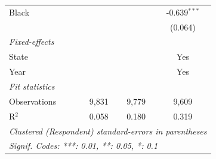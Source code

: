 \begin{tabular}{lccc}
   Black                          &                &                & -0.639$^{***}$\\   
                                  &                &                & (0.064)\\   
   \midrule
   \emph{Fixed-effects}\\
   State                          &                &                & Yes\\  
   Year                           &                &                & Yes\\  
   \midrule
   \emph{Fit statistics}\\
   Observations                   & 9,831          & 9,779          & 9,609\\  
   R$^2$                          & 0.058          & 0.180          & 0.319\\  
   \midrule \midrule
   \multicolumn{4}{l}{\emph{Clustered (Respondent) standard-errors in parentheses}}\\
   \multicolumn{4}{l}{\emph{Signif. Codes: ***: 0.01, **: 0.05, *: 0.1}}\\
\end{tabular}
\par\endgroup


